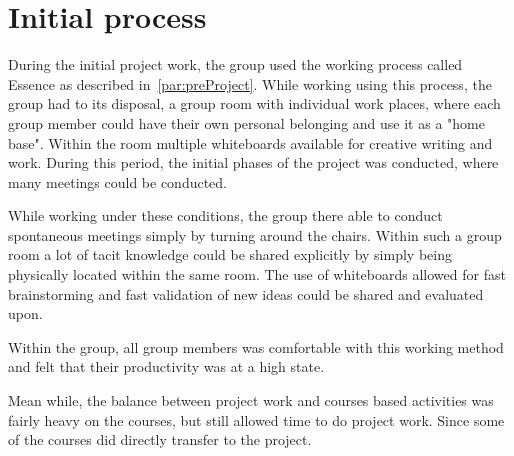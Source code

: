 \section{Initial process}
During the initial project work, the group used the working process called Essence as described in~\autoref{par:preProject}.
While working using this process, the group had to its disposal, a group room with individual work places, where each group member could have their own personal belonging and use it as a "home base".
Within the room multiple whiteboards available for creative writing and work.
During this period, the initial phases of the project was conducted, where many meetings could be conducted.

While working under these conditions, the group there able to conduct spontaneous meetings simply by turning around the chairs.
Within such a group room a lot of tacit knowledge could be shared explicitly by simply being physically located within the same room.
The use of whiteboards allowed for fast brainstorming and fast validation of new ideas could be shared and evaluated upon.

Within the group, all group members was comfortable with this working method and felt that their productivity was at a high state. 

Mean while, the balance between project work and courses based activities was fairly heavy on the courses, but still allowed time to do project work.
Since some of the courses did directly transfer to the project.